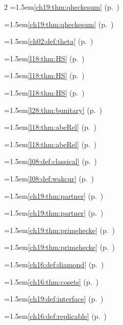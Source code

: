 \begin{multicols}{2}
\hangindent=1.5em\quad \ref{ch19:thm:qheckesum} (p.~\pageref{ch19:thm:qheckesum})\par
\hangindent=1.5em\quad \ref{ch19:thm:qheckesum} (p.~\pageref{ch19:thm:qheckesum})\par
\hangindent=1.5em\quad \ref{ch02:def:theta} (p.~\pageref{ch02:def:theta})\par
\hangindent=1.5em\quad \ref{l18:thm:HS} (p.~\pageref{l18:thm:HS})\par
\hangindent=1.5em\quad \ref{l18:thm:HS} (p.~\pageref{l18:thm:HS})\par
\hangindent=1.5em\quad \ref{l18:thm:HS} (p.~\pageref{l18:thm:HS})\par
\hangindent=1.5em\quad \ref{l28:thm:bunitary} (p.~\pageref{l28:thm:bunitary})\par
\hangindent=1.5em\quad \ref{l18:thm:abeRel} (p.~\pageref{l18:thm:abeRel})\par
\hangindent=1.5em\quad \ref{l18:thm:abeRel} (p.~\pageref{l18:thm:abeRel})\par
\hangindent=1.5em\quad \ref{l08:def:classical} (p.~\pageref{l08:def:classical})\par
\hangindent=1.5em\quad \ref{l08:def:wakcur} (p.~\pageref{l08:def:wakcur})\par
\hangindent=1.5em\quad \ref{ch19:thm:partner} (p.~\pageref{ch19:thm:partner})\par
\hangindent=1.5em\quad \ref{ch19:thm:partner} (p.~\pageref{ch19:thm:partner})\par
\hangindent=1.5em\quad \ref{ch19:thm:primehecke} (p.~\pageref{ch19:thm:primehecke})\par
\hangindent=1.5em\quad \ref{ch19:thm:primehecke} (p.~\pageref{ch19:thm:primehecke})\par
\hangindent=1.5em\quad \ref{ch16:def:diamond} (p.~\pageref{ch16:def:diamond})\par
\hangindent=1.5em\quad \ref{ch16:thm:cosets} (p.~\pageref{ch16:thm:cosets})\par
\hangindent=1.5em\quad \ref{ch19:def:interface} (p.~\pageref{ch19:def:interface})\par
\hangindent=1.5em\quad \ref{ch16:def:replicable} (p.~\pageref{ch16:def:replicable})\par

\end{multicols}
